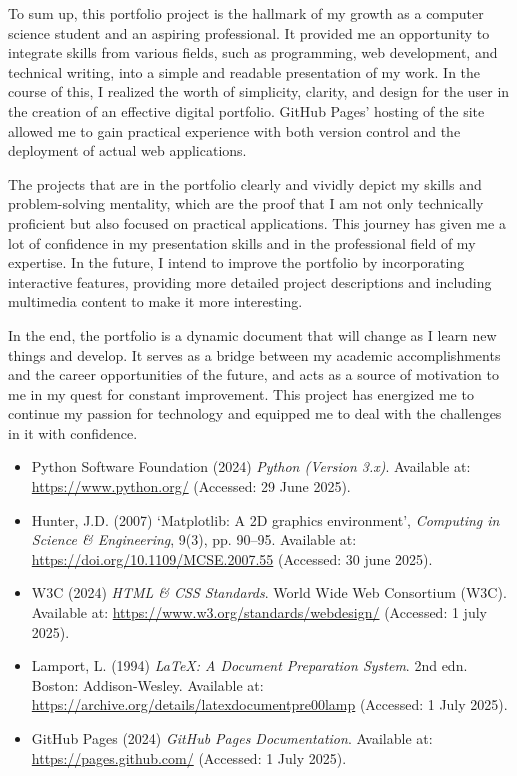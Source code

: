 \documentclass[12pt,a4paper]{article}
\begin{document}
To sum up, this portfolio project is the hallmark of my growth as a computer science student and an aspiring professional. It provided me an opportunity to integrate skills from various fields, such as programming, web development, and technical writing, into a simple and readable presentation of my work. In the course of this, I realized the worth of simplicity, clarity, and design for the user in the creation of an effective digital portfolio. GitHub Pages' hosting of the site allowed me to gain practical experience with both version control and the deployment of actual web applications.

The projects that are in the portfolio clearly and vividly depict my skills and problem-solving mentality, which are the proof that I am not only technically proficient but also focused on practical applications. This journey has given me a lot of confidence in my presentation skills and in the professional field of my expertise. In the future, I intend to improve the portfolio by incorporating interactive features, providing more detailed project descriptions and including multimedia content to make it more interesting.

In the end, the portfolio is a dynamic document that will change as I learn new things and develop. It serves as a bridge between my academic accomplishments and the career opportunities of the future, and acts as a source of motivation to me in my quest for constant improvement. This project has energized me to continue my passion for technology and equipped me to deal with the challenges in it with confidence.


\begin{itemize}
    \item Python Software Foundation (2024) \textit{Python (Version 3.x)}. Available at: \url{https://www.python.org/} (Accessed: 29 June 2025).
    
    \item Hunter, J.D. (2007) ‘Matplotlib: A 2D graphics environment’, \textit{Computing in Science \& Engineering}, 9(3), pp. 90–95. Available at: \url{https://doi.org/10.1109/MCSE.2007.55} (Accessed: 30 june 2025).
    
    \item W3C (2024) \textit{HTML \& CSS Standards}. World Wide Web Consortium (W3C). Available at: \url{https://www.w3.org/standards/webdesign/} (Accessed: 1 july 2025).
    
    \item Lamport, L. (1994) \textit{LaTeX: A Document Preparation System}. 2nd edn. Boston: Addison-Wesley. Available at: \url{https://archive.org/details/latexdocumentpre00lamp} (Accessed: 1 July 2025).
    
    \item GitHub Pages (2024) \textit{GitHub Pages Documentation}. Available at: \url{https://pages.github.com/} (Accessed: 1 July 2025).
\end{itemize}
\end{document}
